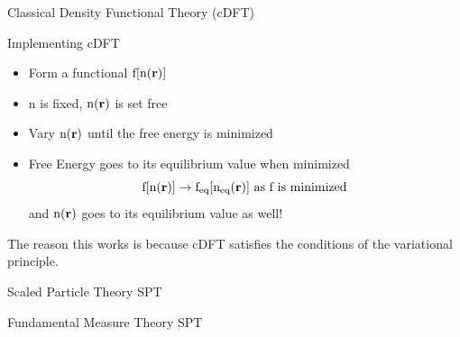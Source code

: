 \documentclass{beamer}
\renewcommand{\vec}[1]{\mathbf{#1}}
\begin{document}
\begin{frame}{Classical Density Functional Theory (cDFT)}
    \begin{block}{Implementing cDFT}
    \begin{itemize}
       \item Form a functional $\text f[\text n(\vec r)]$
       \item n is fixed, $\text n(\vec{r})$ is set free
       \item Vary $\text n(\vec{r})$ until the free energy is minimized 
       \item Free Energy goes to its equilibrium value when minimized      
       \begin{displaymath}\text f[\text n(\vec r)]\rightarrow \text f_{\text{eq}}[\text n_{\text{eq}}(\vec r)]  \mbox{ as f is minimized} \end{displaymath}
       and $\text n(\vec{r})$ goes to its equilibrium value as well!
       
     \end{itemize} 
     \end{block}
The reason this works is because cDFT satisfies the conditions 
of the variational principle.     
\end{frame}

\begin{frame}{Scaled Particle Theory}
  SPT
\end{frame}

\begin{frame}{Fundamental Measure Theory}
  SPT
\end{frame}
\end{document}
